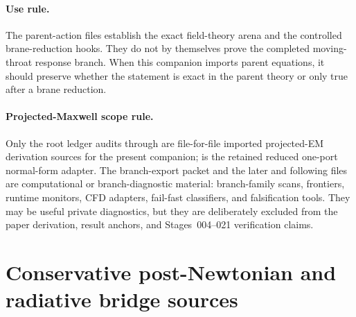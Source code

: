 \paragraph{Use rule.}
The parent-action files establish the exact field-theory arena and the controlled brane-reduction hooks.  They do not by themselves prove the completed moving-throat response branch.  When this companion imports parent equations, it should preserve whether the statement is exact in the parent theory or only true after a brane reduction.

\paragraph{Projected-Maxwell scope rule.}
Only the root ledger audits
through
are file-for-file imported projected-EM derivation sources for the present
companion; 
is the retained reduced one-port normal-form adapter.  The
 branch-export packet and the later
 and following files are computational or
branch-diagnostic material: branch-family scans, frontiers, runtime monitors,
CFD adapters, fail-fast classifiers, and falsification tools.  They may be
useful private diagnostics, but they are deliberately excluded from the paper
derivation, result anchors, and Stages~004--021 verification claims.

\section{Conservative post-Newtonian and radiative bridge sources}
\label{sec:pn-source-files}

